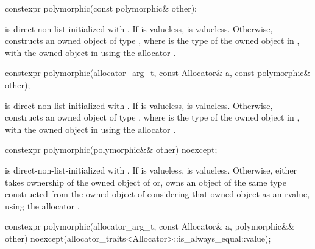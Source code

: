 %
\begin{itemdecl}
constexpr polymorphic(const polymorphic& other);
\end{itemdecl}

\begin{itemdescr}
\pnum
\effects
{} is direct-non-list-initialized with
.
If  is valueless,  is valueless.
Otherwise,
constructs an owned object of type , where
 is the type of the owned object in , with
the owned object in  using the allocator .
\end{itemdescr}

%
\begin{itemdecl}
constexpr polymorphic(allocator_arg_t, const Allocator& a, const polymorphic& other);
\end{itemdecl}

\begin{itemdescr}
\pnum
\effects
{} is direct-non-list-initialized with .
If  is valueless,  is valueless.
Otherwise,
constructs an owned object of type , where
 is the type of the owned object in , with
the owned object in  using the allocator .
\end{itemdescr}

%
\begin{itemdecl}
constexpr polymorphic(polymorphic&& other) noexcept;
\end{itemdecl}

\begin{itemdescr}
\pnum
\effects
{} is direct-non-list-initialized with
.
If  is valueless,  is valueless.
Otherwise,
either 
takes ownership of the owned object of  or,
owns an object of the same type
constructed from the owned object of 
considering that owned object as an rvalue,
using the allocator .
\end{itemdescr}

%
\begin{itemdecl}
constexpr polymorphic(allocator_arg_t, const Allocator& a, polymorphic&& other)
  noexcept(allocator_traits<Allocator>::is_always_equal::value);
\end{itemdecl}

